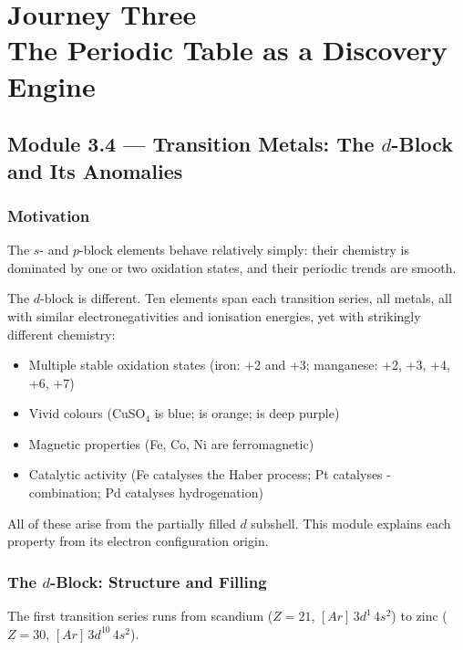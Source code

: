 \documentclass[12pt, a4paper]{book}
\begin{document}
\setcounter{chapter}{2}
\chapter[Journey 3 --- The Periodic Table as a Discovery Engine]
        {Journey Three\\[8pt]
         \textcolor{ModuleColor}{\large The Periodic Table as a Discovery Engine}}
\setcounter{section}{3}

\section{Module 3.4 --- Transition Metals: The $d$-Block and Its Anomalies}
\label{sec:mod3.4}

\subsection*{Motivation}

The $s$- and $p$-block elements behave relatively simply:
their chemistry is dominated by one or two oxidation states,
and their periodic trends are smooth.

The $d$-block is different.
Ten elements span each transition series, all metals,
all with similar electronegativities and ionisation energies,
yet with strikingly different chemistry:
\begin{itemize}[nosep, leftmargin=2em]
  \item Multiple stable oxidation states
        (iron: +2 and +3; manganese: +2, +3, +4, +6, +7)
  \item Vivid colours (CuSO$_4$ is blue;  is orange;
         is deep purple)
  \item Magnetic properties (Fe, Co, Ni are ferromagnetic)
  \item Catalytic activity (Fe catalyses the Haber process;
        Pt catalyses - combination;
        Pd catalyses hydrogenation)
\end{itemize}

All of these arise from the partially filled $d$ subshell.
This module explains each property from its electron
configuration origin.

\subsection{The $d$-Block: Structure and Filling}

The first transition series runs from scandium ($Z=21$,
$[Ar]\,3d^1\,4s^2$) to zinc ($Z=30$, $[Ar]\,3d^{10}\,4s^2$).
\end{document}

